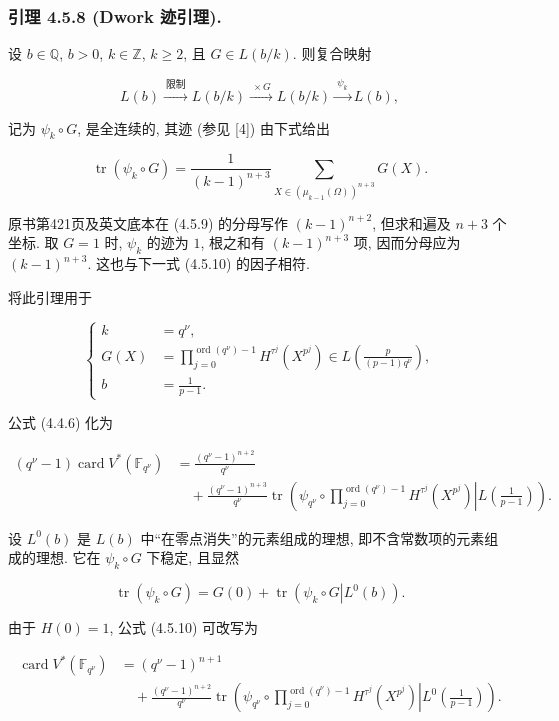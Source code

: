 \subsubsection*{引理 4.5.8 (Dwork 迹引理).}
设 $b\in\mathbb Q$, $b>0$, $k\in\mathbb Z$, $k\geq2$, 且 $G\in L(b/k)$.
则复合映射

\[
L(b)\xrightarrow{\ \text{限制}\ }L(b/k)
\xrightarrow{\ \times G\ }L(b/k)
\xrightarrow{\ \psi_k\ }L(b),
\]

记为 $\psi_k\circ G$, 是全连续的, 其迹 (参见 [4]) 由下式给出

\begin{equation}\tag{4.5.9}
\operatorname{tr}(\psi_k\circ G)
=\frac1{(k-1)^{n+3}}
\sum_{X\in(\mu_{k-1}(\Omega))^{n+3}}G(X).
\end{equation}

\begin{editorialnote}
原书第421页及英文底本在 (4.5.9) 的分母写作 $(k-1)^{n+2}$, 但求和遍及 $n+3$ 个坐标.
取 $G=1$ 时, $\psi_k$ 的迹为 $1$, 根之和有 $(k-1)^{n+3}$ 项, 因而分母应为 $(k-1)^{n+3}$.
这也与下一式 (4.5.10) 的因子相符.
\end{editorialnote}

将此引理用于

\[
\left\{
\begin{aligned}
k&=q^\nu,\\
G(X)&=\prod_{j=0}^{\operatorname{ord}(q^\nu)-1}
H^{\tau^j}(X^{p^j})
\in L\!\left(\frac{p}{(p-1)q^\nu}\right),\\
b&=\frac1{p-1}.
\end{aligned}
\right.
\]

公式 (4.4.6) 化为

\begin{equation}\tag{4.5.10}
\begin{aligned}
(q^\nu-1)\operatorname{card}V^*(\mathbb F_{q^\nu})
&=\frac{(q^\nu-1)^{n+2}}{q^\nu}\\
&\quad+\frac{(q^\nu-1)^{n+3}}{q^\nu}
\operatorname{tr}\!\left(
\left.\psi_{q^\nu}\circ
\prod_{j=0}^{\operatorname{ord}(q^\nu)-1}H^{\tau^j}(X^{p^j})
\right|L\!\left(\frac1{p-1}\right)\right).
\end{aligned}
\end{equation}

设 $L^0(b)$ 是 $L(b)$ 中“在零点消失”的元素组成的理想, 即不含常数项的元素组成的理想.
它在 $\psi_k\circ G$ 下稳定, 且显然

\begin{equation}\tag{4.5.11}
\operatorname{tr}(\psi_k\circ G)
=G(0)+\operatorname{tr}\!\left(\left.\psi_k\circ G\right|L^0(b)\right).
\end{equation}

由于 $H(0)=1$, 公式 (4.5.10) 可改写为

\begin{equation}\tag{4.5.12}
\begin{aligned}
\operatorname{card}V^*(\mathbb F_{q^\nu})
&=(q^\nu-1)^{n+1}\\
&\quad+\frac{(q^\nu-1)^{n+2}}{q^\nu}
\operatorname{tr}\!\left(
\left.\psi_{q^\nu}\circ
\prod_{j=0}^{\operatorname{ord}(q^\nu)-1}H^{\tau^j}(X^{p^j})
\right|L^0\!\left(\frac1{p-1}\right)\right).
\end{aligned}
\end{equation}
